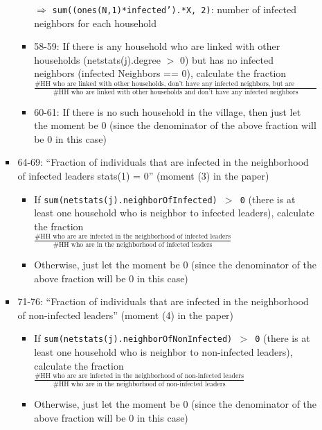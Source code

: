 \documentclass[10pt,letterpaper]{article}
\begin{document}
\begin{itemize}
\begin{itemize}
\begin{itemize}
\begin{itemize}
                $\Rightarrow$ \texttt{sum((ones(N,1)*infected').*X, 2)}: number of infected neighbors for each household
              \item 58-59: If there is any household who are linked with other households (netstats(j).degree $>$ 0) but has no infected neighbors (infected Neighbors == 0), 
                calculate the fraction $\frac{\text{\# HH who are linked with other households, don't have any infected neighbors, but are infected themselves}}{\text{\# HH who are linked with other households and don't have any infected neighbors}}$
              \item 60-61: If there is no such household in the village, then just let the moment be $0$ (since the denominator of the above fraction will be $0$ in this case)
            \end{itemize}
          \item 64-69: ``Fraction of individuals that are infected in the neighborhood of infected leaders stats(1) = 0'' (moment (3) in the paper)
            \begin{itemize}
              \item If \texttt{sum(netstats(j).neighborOfInfected) $>$ 0} (there is at least one household who is neighbor to infected leaders), calculate the fraction \\ $\frac{\text{\# HH who are are infected in the neighborhood of infected leaders}}{\text{\# HH who are in the neighborhood of infected leaders}}$
              \item Otherwise, just let the moment be $0$ (since the denominator of the above fraction will be $0$ in this case)
            \end{itemize}
          \item 71-76: ``Fraction of individuals that are infected in the neighborhood of non-infected leaders'' (moment (4) in the paper)
            \begin{itemize}
              \item If \texttt{sum(netstats(j).neighborOfNonInfected) $>$ 0} (there is at least one household who is neighbor to non-infected leaders), calculate the fraction \\ $\frac{\text{\# HH who are are infected in the neighborhood of non-infected leaders}}{\text{\# HH who are in the neighborhood of non-infected leaders}}$
              \item Otherwise, just let the moment be $0$ (since the denominator of the above fraction will be $0$ in this case)
            \end{itemize}

\end{itemize}
\end{itemize}
\end{itemize}
\end{document}
